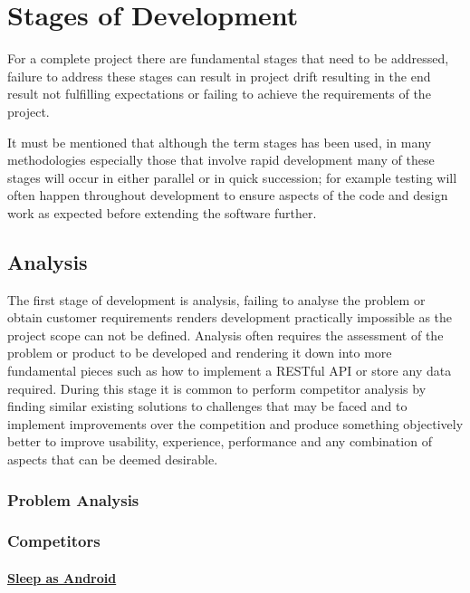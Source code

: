 \section{Stages of Development}\label{stages-of-development}

For a complete project there are fundamental stages that need to be
addressed, failure to address these stages can result in project drift
resulting in the end result not fulfilling expectations or failing to
achieve the requirements of the project.

It must be mentioned that although the term stages has been used, in
many methodologies especially those that involve rapid development many
of these stages will occur in either parallel or in quick succession;
for example testing will often happen throughout development to ensure
aspects of the code and design work as expected before extending the
software further.

\subsection{Analysis}\label{analysis}

The first stage of development is analysis, failing to analyse the
problem or obtain customer requirements renders development practically
impossible as the project scope can not be defined. Analysis often
requires the assessment of the problem or product to be developed and
rendering it down into more fundamental pieces such as how to implement
a RESTful API or store any data required. During this stage it is common
to perform competitor analysis by finding similar existing solutions to
challenges that may be faced and to implement improvements over the
competition and produce something objectively better to improve
usability, experience, performance and any combination of aspects that
can be deemed desirable.

\subsubsection{Problem Analysis}\label{problem-analysis}

\subsubsection{Competitors}\label{competitors}

\paragraph{\texorpdfstring{\href{http://sleep.urbandroid.org/}{Sleep as
Android}}{Sleep as Android}}\label{sleep-as-android}

